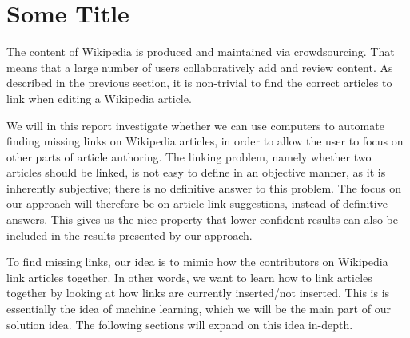 \section{Some Title}
The content of Wikipedia is produced and maintained via crowdsourcing. That means that a large number of users collaboratively add and review content. As described in the previous section, it is non-trivial to find the correct articles to link when editing a Wikipedia article.

We will in this report investigate whether we can use computers to automate finding missing links on Wikipedia articles, in order to allow the user to focus on other parts of article authoring. The linking problem, namely whether two articles should be linked, is not easy to define in an objective manner, as it is inherently subjective; there is no definitive answer to this problem. The focus on our approach will therefore be on article link suggestions, instead of definitive answers. This gives us the nice property that lower confident results can also be included in the results presented by our approach.

To find missing links, our idea is to mimic how the contributors on Wikipedia link articles together. In other words, we want to learn how to link articles together by looking at how links are currently inserted/not inserted. This is is essentially the idea of machine learning, which we will be the main part of our solution idea. The following sections will expand on this idea in-depth.